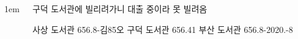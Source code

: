 \documentclass[	17pt, 
							a1paper, 
							portrait, %
							margin=0mm, %
							innermargin=10mm,  		%
							blockverticalspace=4mm, %
							colspace=5mm, 
							subcolspace=0mm
							]{tikzposter}
\begin{document}
\begin{columns}
{\begin{LARGE}
				\end{LARGE}
			}


%


%
%
%
%
%
%
%
%






			{
					\setlength{\leftmargini}{4em}
					\setlength{\labelsep} {1em}
				\begin{LARGE}
구덕 도서관에 빌리려가니 대출 중이라 못 빌려옴

사상 도서관  656.8-김85오  
구덕 도서관  656.41  
부산 도서관  656.8-2020.-8  
				\end{LARGE}
			}







\end{columns}
\end{document}
